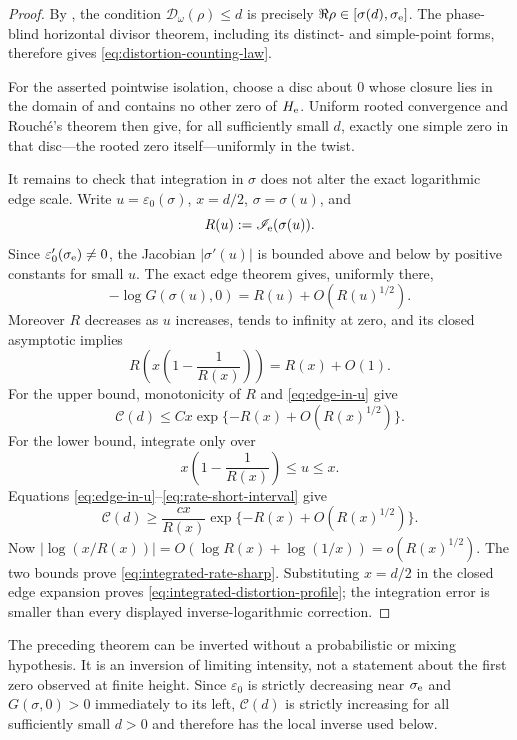 \documentclass[11pt]{article}
\theoremstyle{definition}
\theoremstyle{remark}
\newcommand{\eps}{\varepsilon}
\begin{document}
\begin{proof}
By , the condition
$\mathcal D_\omega(\rho)\leq d$ is precisely
$\Re\rho\in[\sigma(d),\sigma_{\rm e}]$.  The phase-blind horizontal
divisor theorem, including its distinct- and simple-point forms, therefore
gives \eqref{eq:distortion-counting-law}.

For the asserted pointwise isolation, choose a disc about $0$ whose closure
lies in the domain of  and contains no
other zero of $H_{\rm e}$.  Uniform rooted convergence and Rouch\'e's theorem
then give, for all sufficiently small $d$, exactly one simple zero in that
disc---the rooted zero itself---uniformly in the twist.

It remains to check that integration in $\sigma$ does not alter the exact
logarithmic edge scale.  Write $u=\eps_0(\sigma)$,
$x=d/2$, $\sigma=\sigma(u)$, and
\[
 R(u):=\mathscr I_{\rm e}(\sigma(u)).
\]
Since $\eps_0'(\sigma_{\rm e})\neq0$, the Jacobian
$|\sigma'(u)|$ is bounded above and below by positive constants for small
$u$.  The exact edge theorem gives, uniformly there,
\begin{equation}
\label{eq:edge-in-u}
 -\log G(\sigma(u),0)=R(u)+O(R(u)^{1/2}).
\end{equation}
Moreover $R$ decreases as $u$ increases, tends to infinity at zero, and its
closed asymptotic implies
\begin{equation}
\label{eq:rate-short-interval}
 R\left(x\left(1-\frac1{R(x)}\right)\right)=R(x)+O(1).
\end{equation}
For the upper bound, monotonicity of $R$ and
\eqref{eq:edge-in-u} give
\[
 \mathcal C(d)
 \leq Cx\exp\{-R(x)+O(R(x)^{1/2})\}.
\]
For the lower bound, integrate only over
\[
 x\left(1-\frac1{R(x)}\right)\leq u\leq x.
\]
Equations \eqref{eq:edge-in-u}--\eqref{eq:rate-short-interval} give
\[
 \mathcal C(d)
 \geq \frac{cx}{R(x)}
       \exp\{-R(x)+O(R(x)^{1/2})\}.
\]
Now $|\log(x/R(x))|=O(\log R(x)+\log(1/x))=o(R(x)^{1/2})$.
The two bounds prove \eqref{eq:integrated-rate-sharp}.  Substituting
$x=d/2$ in the closed edge expansion proves
\eqref{eq:integrated-distortion-profile}; the integration error is smaller
than every displayed inverse-logarithmic correction.
\end{proof}

The preceding theorem can be inverted without a probabilistic or mixing
hypothesis.  It is an inversion of limiting intensity, not a statement about
the first zero observed at finite height.  Since $\eps_0$ is strictly
decreasing near $\sigma_{\rm e}$ and $G(\sigma,0)>0$ immediately to its left,
$\mathcal C(d)$ is strictly increasing for all sufficiently small $d>0$ and
therefore has the local inverse used below.
\end{document}
